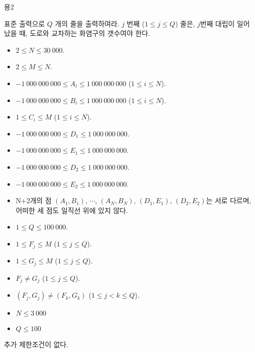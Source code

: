 \begin{problem}{용2}
	
	\OutputFile
	
	표준 출력으로 $Q$ 개의 줄을 출력하여라. $j$ 번째 ($1 \le j \le Q$) 줄은, $j$번째 대립이 일어났을 때, 도로와 교차하는 화염구의 갯수여야 한다.
	
	\Constraints
	
	\begin{itemize}
		\item $2 \le N \le 30\ 000$.
		\item $2 \le M \le N$.
		\item $-1\ 000\ 000\ 000 \le A_i \le 1\ 000\ 000\ 000$ ($1 \le i \le N$).
		\item $-1\ 000\ 000\ 000 \le B_i \le 1\ 000\ 000\ 000$ ($1 \le i \le N$).
		\item $1 \le C_i \le M$ ($1 \le i \le N$).
		\item $-1\ 000\ 000\ 000 \le D_1 \le 1\ 000\ 000\ 000$.
		\item $-1\ 000\ 000\ 000 \le E_1 \le 1\ 000\ 000\ 000$.
		\item $-1\ 000\ 000\ 000 \le D_2 \le 1\ 000\ 000\ 000$.
		\item $-1\ 000\ 000\ 000 \le E_2 \le 1\ 000\ 000\ 000$.
		\item N+2개의 점 $(A_1, B_1)$, $\cdots$, $(A_N, B_N)$, $(D_1, E_1)$, $(D_2, E_2)$는 서로 다르며, 어떠한 세 점도 일직선 위에 있지 않다.
		\item $1 \le Q \le 100\ 000$.
		\item $1 \le F_j \le M$ ($1 \le j \le Q$).
		\item $1 \le G_j \le M$ ($1 \le j \le Q$).
		\item $F_j \ne G_j$ ($1 \le j \le Q$).
		\item $(F_j, G_j) \ne (F_k, G_k)$ ($1 \le j < k \le Q$).
	\end{itemize}
	
	
	\begin{itemize}
		\item $N \le 3\ 000$
	\end{itemize}
	
	\begin{itemize}
		\item $Q \le 100$
	\end{itemize}
	
	
	추가 제한조건이 없다.
	
	\Examples
	
	\begin{example}
	\end{example}
	

\end{problem}
